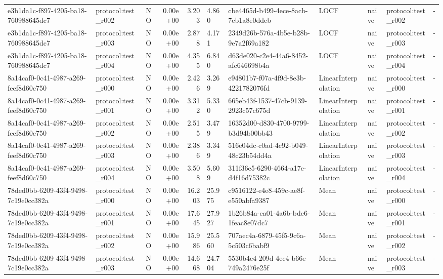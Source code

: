 \begin{table}[htbp]
\begin{tabular}{llrrr}
e3b1da1c-f897-4205-ba18-760988645dc7 & protocol:test\_r002 & NO & 0.00e+00 & 3.203 & 4.860 & cbe4465d-b499-4ece-8acb-7eb1a8e0ddeb & LOCF & naive & protocol:test\_r002 & - \\
e3b1da1c-f897-4205-ba18-760988645dc7 & protocol:test\_r003 & NO & 0.00e+00 & 2.878 & 4.171 & 2349d26b-576a-4b5e-b28b-9e7a2f69a182 & LOCF & naive & protocol:test\_r003 & - \\
e3b1da1c-f897-4205-ba18-760988645dc7 & protocol:test\_r004 & NO & 0.00e+00 & 4.355 & 6.840 & d63de020-c2e4-44a6-8452-afc646698b4a & LOCF & naive & protocol:test\_r004 & - \\
8a14caf0-0c41-4987-a269-feef8d60c750 & protocol:test\_r000 & NO & 0.00e+00 & 2.426 & 3.269 & e94801b7-f07a-4f9d-8e3b-4221782076fd & LinearInterpolation & naive & protocol:test\_r000 & - \\
8a14caf0-0c41-4987-a269-feef8d60c750 & protocol:test\_r001 & NO & 0.00e+00 & 3.312 & 5.330 & 665eb43f-1537-47cb-9139-2923c57c675d & LinearInterpolation & naive & protocol:test\_r001 & - \\
8a14caf0-0c41-4987-a269-feef8d60c750 & protocol:test\_r002 & NO & 0.00e+00 & 2.515 & 3.479 & 16352d00-d830-4700-9799-b3d94b00bb43 & LinearInterpolation & naive & protocol:test\_r002 & - \\
8a14caf0-0c41-4987-a269-feef8d60c750 & protocol:test\_r003 & NO & 0.00e+00 & 2.386 & 3.349 & 516e04dc-c0ad-4c92-b049-48c23b54dd4a & LinearInterpolation & naive & protocol:test\_r003 & - \\
8a14caf0-0c41-4987-a269-feef8d60c750 & protocol:test\_r004 & NO & 0.00e+00 & 3.508 & 5.609 & 311f36e5-6290-4664-a17e-d4f16d75382c & LinearInterpolation & naive & protocol:test\_r004 & - \\
78ded0bb-6209-43f4-9498-7c19e0cc382a & protocol:test\_r000 & NO & 0.00e+00 & 16.203 & 25.975 & c9516122-e4e8-459c-ae8f-e550abfa9387 & Mean & naive & protocol:test\_r000 & - \\
78ded0bb-6209-43f4-9498-7c19e0cc382a & protocol:test\_r001 & NO & 0.00e+00 & 17.645 & 27.927 & 1b26b84a-ea01-4a6b-bde6-1feac8e07dc7 & Mean & naive & protocol:test\_r001 & - \\
78ded0bb-6209-43f4-9498-7c19e0cc382a & protocol:test\_r002 & NO & 0.00e+00 & 15.986 & 25.560 & 707aec4a-6879-45f5-9c6a-5c503c6babf9 & Mean & naive & protocol:test\_r002 & - \\
78ded0bb-6209-43f4-9498-7c19e0cc382a & protocol:test\_r003 & NO & 0.00e+00 & 14.668 & 24.704 & 5530b4e4-209d-4ee4-b66e-749a2476e25f & Mean & naive & protocol:test\_r003 & - \\

\end{tabular}
\end{table}
